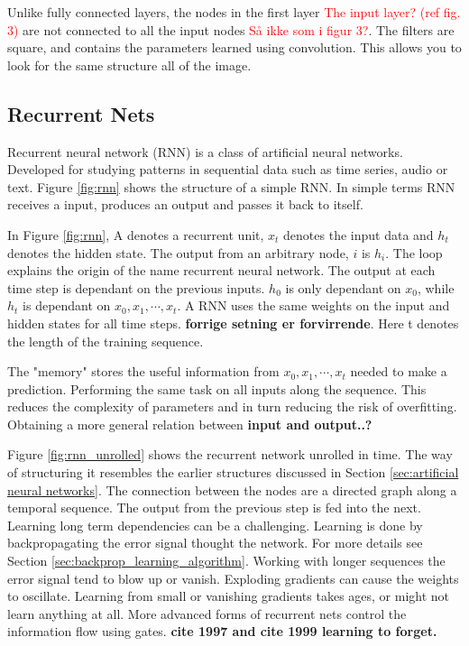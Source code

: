 \documentclass{article}
\begin{document}
Unlike fully connected layers, the nodes in the first layer \textcolor{red}{The input layer? (ref fig. 3)} are not connected to all the input nodes \textcolor{red}{Så ikke som i figur 3?}. The filters are square, and contains the parameters learned using convolution. This allows you to look for the same structure all of the image. %

\subsection{Recurrent Nets} \label{sec:reccurent_nets}
Recurrent neural network (RNN) is a class of artificial neural networks. Developed for studying patterns in sequential data such as time series, audio or text. Figure \ref{fig:rnn} shows the structure of a simple RNN. In simple terms RNN receives a input, produces an output and passes it back to itself. 

In Figure \ref{fig:rnn}, A denotes a recurrent unit, $x_t$ denotes the input data and  $h_t$ denotes the hidden state. The output from an arbitrary node, $i$ is $h_i$. The loop explains the origin of the name recurrent neural network. The output at each time step is dependant on the previous inputs. $h_0$ is only dependant on $x_0$, while $h_t$ is dependant on $x_0, x_1, \cdots, x_t $. A RNN uses the same weights on the input and hidden states for all time steps. \textbf{forrige setning er forvirrende}. Here t denotes the length of the training sequence.

The "memory" stores the useful information from $x_0, x_1, \cdots, x_t $ needed to make a prediction. Performing the same task on all inputs along the sequence. This reduces the complexity of parameters and in turn reducing the risk of overfitting. Obtaining a more general relation between \textbf{input and output..?}

Figure \ref{fig:rnn_unrolled} shows the recurrent network unrolled in time. The way of structuring it resembles the earlier structures discussed in Section \ref{sec:artificial neural networks}. The connection between the nodes %
are a directed graph along a temporal sequence. The output from the previous step is fed into the next. 
Learning long term dependencies can be a challenging. Learning is done by backpropagating the error signal thought the network. For more details see Section \ref{sec:backprop_learning_algorithm}. Working with longer sequences the error signal tend to blow up or vanish. Exploding gradients can cause the weights to oscillate. Learning from small or vanishing gradients takes ages, or might not learn anything at all. More advanced forms of recurrent nets control the information flow using gates. \textbf{cite 1997 and cite 1999 learning to forget.}
\end{document}
